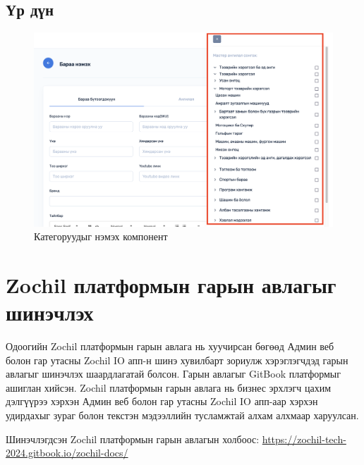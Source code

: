 \subsection{Үр дүн}
\begin{figure}[h]
	\centering
	\includegraphics[scale=0.2]{src/images/category-add.png}
	\caption{Категоруудыг нэмэх компонент}
\end{figure}


\section{Zochil платформын гарын авлагыг шинэчлэх}
Одоогийн Zochil платформын гарын авлага нь хуучирсан бөгөөд Админ веб болон гар утасны Zochil IO апп-н шинэ хувилбарт зориулж хэрэглэгчдэд гарын авлагыг шинэчлэх шаардлагатай болсон. Гарын авлагыг GitBook платформыг ашиглан хийсэн. Zochil платформын гарын авлага нь бизнес эрхлэгч цахим дэлгүүрээ хэрхэн Админ веб болон гар утасны Zochil IO апп-аар хэрхэн удирдахыг зураг болон текстэн мэдээллийн тусламжтай алхам алхмаар харуулсан.

Шинэчлэгдсэн Zochil платформын гарын авлагын холбоос: \url{https://zochil-tech-2024.gitbook.io/zochil-docs/}

